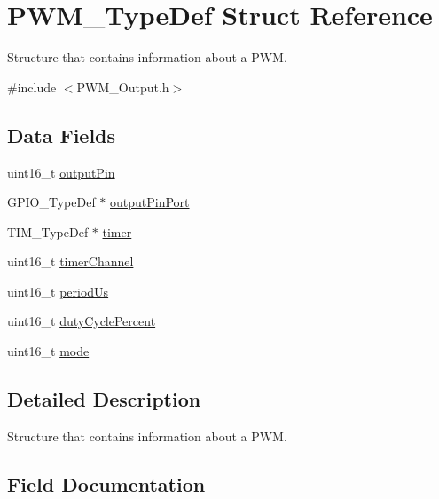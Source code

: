 \hypertarget{struct_p_w_m___type_def}{}\section{P\+W\+M\+\_\+\+Type\+Def Struct Reference}
\label{struct_p_w_m___type_def}


Structure that contains information about a P\+WM.  




{\ttfamily \#include $<$P\+W\+M\+\_\+\+Output.\+h$>$}

\subsection*{Data Fields}
\begin{DoxyCompactItemize}
\item 
uint16\+\_\+t \hyperlink{struct_p_w_m___type_def_ac9de390b24b0d2e907571cccb9d6d2b9}{output\+Pin}
\item 
G\+P\+I\+O\+\_\+\+Type\+Def $\ast$ \hyperlink{struct_p_w_m___type_def_a078cbe468c9fd678c2f5bb96ba35f845}{output\+Pin\+Port}
\item 
T\+I\+M\+\_\+\+Type\+Def $\ast$ \hyperlink{struct_p_w_m___type_def_a5f2d7e0e880def3262a850626e3df17d}{timer}
\item 
uint16\+\_\+t \hyperlink{struct_p_w_m___type_def_a2ceeb6205773419966e920a22828f526}{timer\+Channel}
\item 
uint16\+\_\+t \hyperlink{struct_p_w_m___type_def_a550f3d976917596f0228732fceab7490}{period\+Us}
\item 
uint16\+\_\+t \hyperlink{struct_p_w_m___type_def_a43833ca434f7e3c7d23ff9f780825da3}{duty\+Cycle\+Percent}
\item 
uint16\+\_\+t \hyperlink{struct_p_w_m___type_def_af294e94ca5176720ef5e5cbedc95ca47}{mode}
\end{DoxyCompactItemize}


\subsection{Detailed Description}
Structure that contains information about a P\+WM. 

\subsection{Field Documentation}
\mbox{\label{struct_p_w_m___type_def_a43833ca434f7e3c7d23ff9f780825da3}} 
